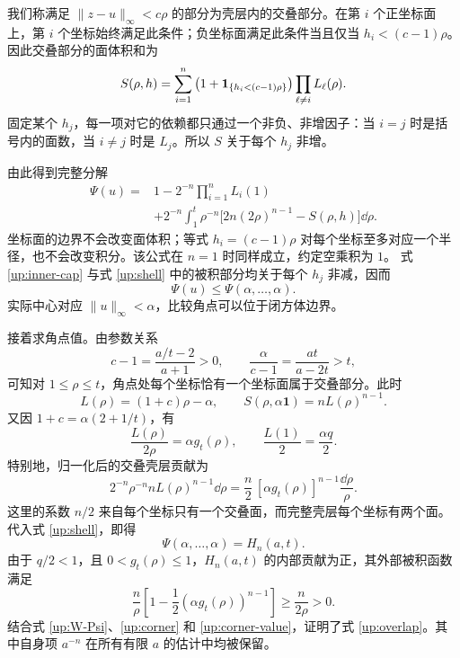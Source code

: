 我们称满足 $\|z-u\|_\infty<c\rho$ 的部分为壳层内的交叠部分。在第 $i$ 个正坐标面上，第 $i$ 个坐标始终满足此条件；负坐标面满足此条件当且仅当 $h_i<(c-1)\rho$。因此交叠部分的面体积和为
\begin{equation}\label{up:face-sum}
 S(\rho,h)=\sum_{i=1}^n
 \left(1+\mathbf{1}_{\{h_i<(c-1)\rho\}}\right)
 \prod_{\ell\ne i}L_\ell(\rho).
\end{equation}
固定某个 $h_j$，每一项对它的依赖都只通过一个非负、非增因子：当 $i=j$ 时是括号内的面数，当 $i\ne j$ 时是 $L_j$。所以 $S$ 关于每个 $h_j$ 非增。

由此得到完整分解
\begin{equation}\label{up:shell}
\begin{split}
 \Psi(u)={}&1-2^{-n}\prod_{i=1}^nL_i(1)\\
 &+2^{-n}\int_1^t\rho^{-n}
  \bigl[2n(2\rho)^{n-1}-S(\rho,h)\bigr]\dd\rho.
\end{split}
\end{equation}
坐标面的边界不会改变面体积；等式 $h_i=(c-1)\rho$ 对每个坐标至多对应一个半径，也不会改变积分。该公式在 $n=1$ 时同样成立，约定空乘积为 $1$。
式 \eqref{up:inner-cap} 与式 \eqref{up:shell} 中的被积部分均关于每个 $h_j$ 非减，因而
\begin{equation}\label{up:corner}
 \Psi(u)\le\Psi(\alpha,\ldots,\alpha).
\end{equation}
实际中心对应 $\|u\|_\infty<\alpha$，比较角点可以位于闭方体边界。

接着求角点值。由参数关系
\[
 c-1=\frac{a/t-2}{a+1}>0,\qquad
 \frac{\alpha}{c-1}=\frac{at}{a-2t}>t,
\]
可知对 $1\le\rho\le t$，角点处每个坐标恰有一个坐标面属于交叠部分。此时
\[
 L(\rho)=(1+c)\rho-\alpha,
 \qquad S(\rho,\alpha\boldsymbol{1})=nL(\rho)^{n-1}.
\]
又因 $1+c=\alpha(2+1/t)$，有
\[
 \frac{L(\rho)}{2\rho}=\alpha g_t(\rho),\qquad
 \frac{L(1)}2=\frac{\alpha q}2.
\]
特别地，归一化后的交叠壳层贡献为
\[
 2^{-n}\rho^{-n}nL(\rho)^{n-1}\dd\rho
 =\frac n2\,[\alpha g_t(\rho)]^{n-1}\frac{\dd\rho}{\rho}.
\]
这里的系数 $n/2$ 来自每个坐标只有一个交叠面，而完整壳层每个坐标有两个面。代入式 \eqref{up:shell}，即得
\begin{equation}\label{up:corner-value}
 \Psi(\alpha,\ldots,\alpha)=H_n(a,t).
\end{equation}
由于 $q/2<1$，且 $0<g_t(\rho)\le1$，$H_n(a,t)$ 的内部贡献为正，其外部被积函数满足
\[
 \frac n\rho\left[1-\frac12(\alpha g_t(\rho))^{n-1}\right]
 \ge\frac n{2\rho}>0.
\]
结合式 \eqref{up:W-Psi}、\eqref{up:corner} 和 \eqref{up:corner-value}，证明了式 \eqref{up:overlap}。其中自身项 $a^{-n}$ 在所有有限 $a$ 的估计中均被保留。

